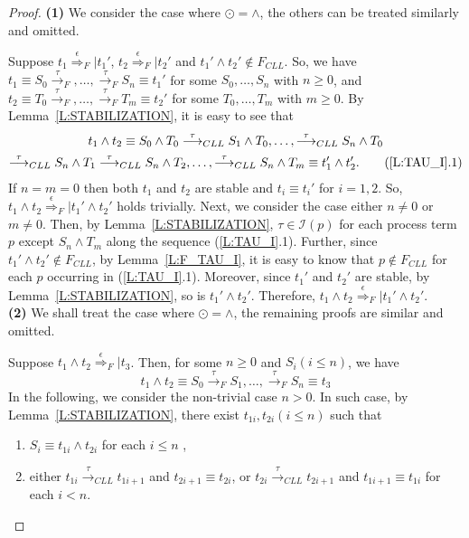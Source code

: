 \documentclass{elsarticle}
\theoremstyle{plain}
\theoremstyle{definition}
\begin{document}
\begin{proof}
\noindent\textbf{(1)} We consider the case where $\odot = \wedge$, the others can be treated similarly and omitted.

Suppose $t_1 \stackrel{\epsilon}{\Longrightarrow}_F| t_1'$, $t_2 \stackrel{\epsilon}{\Longrightarrow}_F|t_2'$ and $t_1' \wedge t_2' \notin F_{{CLL}}$.
So, we have $t_1\equiv S_0 \stackrel{\tau}{\longrightarrow}_F,\dots,\stackrel{\tau}{\longrightarrow}_F S_n\equiv t_1'$ for some $S_0,\dots,S_n$ with $n \geq 0$, and $t_2\equiv T_0 \stackrel{\tau}{\longrightarrow}_F,\dots,\stackrel{\tau}{\longrightarrow}_F T_m\equiv t_2'$ for some $T_0,\dots,T_m$ with $m \geq0$.
    By Lemma~\ref{L:STABILIZATION}, it is easy to see that
    \begin{multline*}
        t_1 \wedge t_2 \equiv S_0 \wedge T_0 \stackrel{\tau}{\longrightarrow}_{{CLL}}S_1 \wedge T_0, \dots, \stackrel{\tau}{\longrightarrow}_{{CLL}} S_n\wedge T_0 \\
    \stackrel{\tau}{\longrightarrow}_{{CLL}} S_n \wedge T_1 \stackrel{\tau}{\longrightarrow}_{{CLL}} S_n \wedge T_2,\dots, \stackrel{\tau}{\longrightarrow}_{{CLL}} S_n\wedge T_m \equiv t_1'\wedge t_2'. \tag{\ref{L:TAU_I}.1}
    \end{multline*}
    If $n=m=0$ then both $t_1$ and $t_2$ are stable and $t_i\equiv t_i'$ for $i=1,2$.
    So, $t_1\wedge t_2 \stackrel{\epsilon}{\Longrightarrow}_F|t_1'\wedge t_2'$ holds trivially.
    Next, we consider the case either $n \neq 0$ or $m \neq 0$.
    Then, by Lemma~\ref{L:STABILIZATION}, $\tau \in {\mathcal I}(p)$ for each process term $p$ except $S_n \wedge T_m$ along the sequence (\ref{L:TAU_I}.1).
    Further, since $t_1'\wedge t_2' \notin F_{CLL}$, by Lemma~\ref{L:F_TAU_I}, it is easy to know that  $p \notin F_{{CLL}}$ for each $p$ occurring in (\ref{L:TAU_I}.1).
    Moreover, since $t_1'$ and $t_2'$ are stable, by Lemma~\ref{L:STABILIZATION}, so is $t_1'\wedge t_2'$.
    Therefore, $t_1\wedge t_2 \stackrel{\epsilon}{\Longrightarrow}_F| t_1' \wedge t_2'$.\\

\noindent \textbf{(2)}
    We shall treat the case where $\odot = \wedge$, the remaining proofs are similar and omitted.

    Suppose $t_1 \wedge t_2 \stackrel{\epsilon}{\Longrightarrow}_F| t_3$. Then, for some $n \geq 0$ and $S_i(i\leq n)$, we have
    \[t_1 \wedge t_2 \equiv S_0 \stackrel{\tau}{\longrightarrow}_F S_1,\dots,\stackrel{\tau}{\longrightarrow}_F S_n \equiv t_3 \]
     In the following, we consider the non-trivial case $n>0$. In such case, by Lemma~\ref{L:STABILIZATION}, there exist $t_{1i},t_{2i}(i\leq n)$ such that
     \begin{enumerate}
       \item $S_i \equiv t_{1i} \wedge t_{2i}$  for each $i\leq n$ ,
       \item either $t_{1i} \stackrel{\tau}{\longrightarrow}_{CLL} t_{1i+1}$ and $t_{2i+1}\equiv t_{2i}$, or  $t_{2i} \stackrel{\tau}{\longrightarrow}_{CLL} t_{2i+1}$ and $t_{1i+1}\equiv t_{1i}$  for each $i< n$.
     \end{enumerate}


\end{proof}
\end{document}
